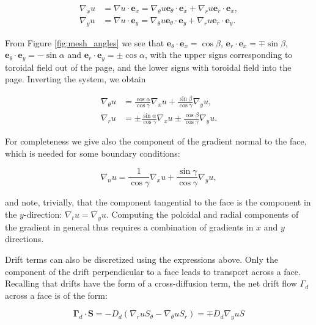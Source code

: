 \begin{align*}
\nabla_x u & = \nabla u \cdot \mathbf{e}_x = \nabla_\theta u \mathbf{e}_\theta \cdot \mathbf{e}_x + \nabla_r u \mathbf{e}_r \cdot \mathbf{e}_x, \\
\nabla_y u & = \nabla u \cdot \mathbf{e}_y = \nabla_\theta u \mathbf{e}_\theta \cdot \mathbf{e}_y + \nabla_r u \mathbf{e}_r \cdot \mathbf{e}_y.
\end{align*}

From Figure \ref{fig:mesh_angles} we see that $\mathbf{e}_\theta \cdot \mathbf{e}_x = \cos \beta$,
 $\mathbf{e}_r \cdot \mathbf{e}_x = \mp \sin \beta$, $\mathbf{e}_\theta \cdot \mathbf{e}_y = -\sin \alpha$
and $\mathbf{e}_r \cdot \mathbf{e}_y = \pm \cos \alpha$, with the upper signs corresponding to toroidal field
out of the page, and the lower signs with toroidal field into the page.
Inverting the system, we obtain

\begin{align*}
\nabla_\theta u & = \frac{\cos \alpha}{\cos \gamma} \nabla_x u + \frac{\sin \beta}{\cos \gamma} \nabla_y u, \\
\nabla_r u & = \pm \frac{\sin \alpha}{\cos \gamma} \nabla_x u \pm \frac{\cos \beta}{\cos \gamma} \nabla_y u.
\end{align*}

For completeness we give also the component of the gradient normal
to the face, which is needed for some boundary conditions:

\begin{equation*}
\nabla_n u = \frac{1}{\cos \gamma} \nabla_x u + \frac{\sin \gamma}{\cos \gamma} \nabla_y u,
\end{equation*}

and note, trivially, that the component tangential to the face is the
component in the $y$-direction: $\nabla_t u = \nabla_y u$.
Computing the poloidal and radial components of the gradient in
general thus requires a combination of gradients in $x$ and $y$ directions.

Drift terms can also be discretized using the expressions above. Only
the component of the drift perpendicular to a face leads to transport
across a face. Recalling that drifts have the form of a cross-diffusion
term, the net drift flow $\Gamma_d$ across a face is of the form:

\begin{equation*}
\mathbf{\Gamma}_d \cdot \mathbf{S} = - D_d \left( \nabla_r u S_\theta - \nabla_\theta u S_r \right) = \mp D_d \nabla_y u S
\end{equation*}

